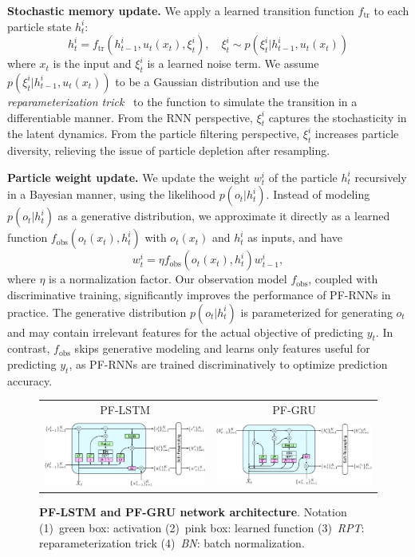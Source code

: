 \documentclass[letterpaper]{article} %
\begin{document}
\textbf{Stochastic memory update.} 
We apply a learned transition function $f_\mathrm{tr}$ to  each particle state $h_t^i$:
\begin{equation}
	h_t^i = f_\mathrm{tr}(h_{t-1}^i, u_t(x_t), \xi_t^i), \quad\xi_t^i\sim p(\xi_t^i | h_{t-1}^i, u_t(x_t))\label{eqn:1}
\end{equation}
where  $x_t$ is the input and $\xi_t^i$ is a learned noise term. We assume $p(\xi_t^i | h_{t-1}^i, u_t(x_t))$ to be a Gaussian distribution
and use the \emph{reparameterization trick}~\cite{kingma2013auto}
to the function to simulate the transition in a differentiable manner. 
From the RNN perspective,  $\xi_t^i$  captures the stochasticity in the latent dynamics. From the particle filtering perspective,  $\xi_t^i$ increases particle diversity, relieving the issue of particle depletion after resampling.  %

\textbf{Particle weight update.} We update the weight $w_t^i$ of the particle $h_t^i$   recursively in a Bayesian manner, using the likelihood $p(o_t|h_{t}^i)$. Instead of  modeling $p(o_t | h_t^i)$ as a  generative distribution, we approximate it directly as a learned function $f_\mathrm{obs}(o_t(x_t), h_t^i)$ with $o_t(x_t)$ and $h_t^i$ as inputs, and have 
\begin{equation}
	w_t^i = \eta f_\mathrm{obs}(o_t(x_t), h_t^i) w_{t-1}^i,
\end{equation}
where $\eta$ is a normalization factor.
Our observation model $f_\mathrm{obs}$, coupled with discriminative training, significantly improves the performance of PF-RNNs in practice. The generative distribution $p(o_t|h_t^i)$ is parameterized for generating $o_t$ and may contain irrelevant features for the actual objective of  predicting $y_t$. In contrast, $f_\mathrm{obs}$ skips  generative modeling 
and learns only features useful for predicting $y_t$, as PF-RNNs are trained discriminatively to optimize prediction accuracy.
\begin{figure}[t]
	\centering
	\begin{tabular}{c c}
		\small PF-LSTM & \small PF-GRU\\
		\includegraphics[width=0.48\linewidth]{figs/PFLSTM.pdf} &
		\includegraphics[width=0.48\linewidth]{figs/PFGRU.pdf}
	\end{tabular}
	\centering
	\caption{\textbf{ PF-LSTM and PF-GRU network architecture}. Notation (1)~green box: activation (2)~pink box: learned function (3)~\textit{RPT}: reparameterization trick (4)~\textit{BN}: batch normalization.}
	\label{fig:nets}
\end{figure}
\end{document}

